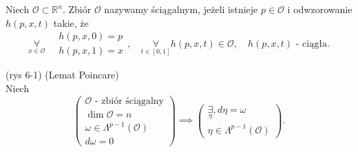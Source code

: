 \documentclass[../main.tex]{subfiles}
\begin{document}
\begin{definicja}
    Niech $\mathcal{O}\subset\mathbb{R}^n$. Zbiór $\mathcal{O}$ nazywamy ściągalnym, jeżeli istnieje $p\in \mathcal{O}$ i odwzorowanie $h(p,x,t)$ takie, że
    \[
        \underset{x\in\mathcal{O}}{\forall}\quad \begin{matrix}h(p,x,0) = p\\ h(p,x,1) = x\end{matrix},\quad \underset{t\in[0,1]}{\forall}  h(p,x,t)\in \mathcal{O}, \quad h(p,x,t) \text{ - ciągła}
    .\]
\end{definicja}
\begin{tw}
    (rys 6-1)
    (Lemat Poincare)\\
    Niech
    \[
        \begin{pmatrix}\mathcal{O} \text{ - zbiór ściągalny}\\ \dim \mathcal{O} = n\\ \omega\in\Lambda^{p-1}(\mathcal{O})\\ d\omega = 0\end{pmatrix} \implies \begin{pmatrix} \underset{\eta}{\exists}, d\eta = \omega \\ \eta\in\Lambda^{p-1}(\mathcal{O}) \end{pmatrix}
    .\]
\end{tw}
\end{document}

